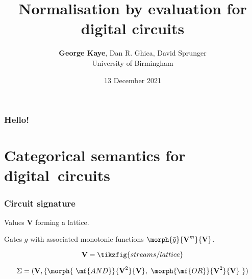 \documentclass[aspectratio=169]{beamer}
\title{Normalisation by evaluation for digital circuits}
\author{\texorpdfstring{\large\textbf{George Kaye}, Dan R. Ghica, David Sprunger \\ \normalsize University of Birmingham}{George Kaye}}
\institute{SYCO 8}
\date{13 December 2021}
\begin{document}
    \maketitle

    \begin{frame}
        \frametitle{Hello!}
    
        
    
    \end{frame}

    \section{Categorical semantics for digital~circuits}

    \begin{frame}
        \frametitle{Circuit signature}
    
        \pause

        \alert{Values} $\textbf{V}$ forming a lattice.

        \pause

        \alert{Gates} $g$ with associated monotonic functions $\morph{\bar{g}}{\textbf{V}^m}{\textbf{V}}$.


        \pause

        \[\textbf{V} = \tikzfig{streams/lattice}\]

        \pause

        \[\Sigma = (\textbf{V}, \{\morph{\ \mf{AND}}{\textbf{V}^2}{\textbf{V}},\ \morph{\mf{OR}}{\textbf{V}^2}{\textbf{V}}\ \})\]

    \end{frame}
\end{document}
